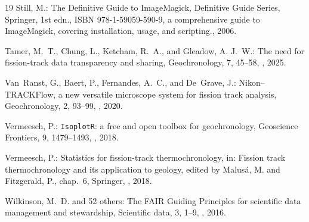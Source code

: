 \documentclass[gchron, manuscript]{copernicus}
\begin{document}
\begin{thebibliography}{19}
Still, M.: The Definitive Guide to ImageMagick, Definitive Guide Series,
  Springer, 1st edn., ISBN 978-1-59059-590-9, a comprehensive guide to
  ImageMagick, covering installation, usage, and scripting., 2006.

Tamer, M.~T., Chung, L., Ketcham, R.~A., and Gleadow, A. J.~W.: The need for
  fission-track data transparency and sharing, Geochronology, 7, 45--58,
  , 2025.

Van~Ranst, G., Baert, P., Fernandes, A.~C., and De~Grave, J.: Nikon--TRACKFlow,
  a new versatile microscope system for fission track analysis, Geochronology,
  2, 93--99, , 2020.

Vermeesch, P.: {\texttt{IsoplotR}: a free and open toolbox for geochronology},
  Geoscience Frontiers, 9, 1479--1493, ,
  2018{}.

Vermeesch, P.: Statistics for fission-track thermochronology, in: Fission track
  thermochronology and its application to geology, edited by Malus\'{a}, M. and
  Fitzgerald, P., chap.~6, Springer, ,
  2018{}.

Wilkinson, M.~D. and {52 others}: {The FAIR Guiding Principles for scientific
  data management and stewardship}, Scientific data, 3, 1--9,
  , 2016.

\end{thebibliography}


%
%
\end{document}

